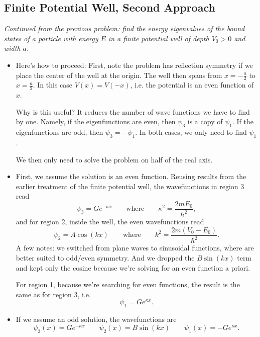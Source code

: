\documentclass[11pt, a4paper]{article}
\newcommand{\eqtext}[1]{\qquad \text{#1} \qquad}
\begin{document}
\subsection{Finite Potential Well, Second Approach}
\textit{Continued from the previous problem: find the energy eigenvalues of the bound states of a particle with energy $ E $ in a finite potential well of depth $ V_{0} > 0 $ and width $ a $.}
\begin{itemize}
	\item Here's how to proceed: First, note the problem has reflection symmetry if we place the center of the well at the origin. The well then spans from $ x = -\frac{a}{2} $ to $ x = \frac{a}{2} $. In this case $ V(x) = V(-x) $, i.e. the potential is an even function of $ x $. 
	
	Why is this useful? It reduces the number of wave functions we have to find by one. Namely, if the eigenfunctions are even, then $ \psi_{3} $ is a copy of $ \psi_{1} $. If the eigenfunctions are odd, then $ \psi_{3} = - \psi_{1} $. In both cases, we only need to find $ \psi_{1} $. 
	
	We then only need to solve the problem on half of the real axis.
	

		
	\item First, we assume the solution is an even function. Reusing results from the earlier treatment of the finite potential well, the wavefunctions in region 3 read
	\begin{equation*}
		\psi_{3} = Ge^{-\kappa x} \eqtext{where} \kappa^{2} = \frac{2mE_{0}}{\hbar^{2}},
	\end{equation*}
	and for region 2, inside the well, the even wavefunctions read
	\begin{equation*}
		\psi_{2} = A \cos(kx) \eqtext{where} k^{2} = \frac{2m(V_{0} - E_{0})}{\hbar^{2}}.
	\end{equation*}
	A few notes: we switched from plane waves to sinusoidal functions, where are better suited to odd/even symmetry. And we dropped the $B\sin(kx)$ term and kept only the cosine because we're solving for an even function a priori.
	
	For region 1, because we're searching for even functions, the result is the same as for region 3, i.e.
	\begin{equation*}
		\psi_{1} = G e^{\kappa x}.
	\end{equation*}
	
	\item If we assume an odd solution, the wavefunctions are
	\begin{equation*}
		\psi_{3}(x) = G e^{-\kappa x} \qquad \psi_{2}(x) = B \sin (kx) \qquad \psi_{1}(x) = -Ge^{\kappa x}.
	\end{equation*}
	

\end{itemize}
\end{document}
